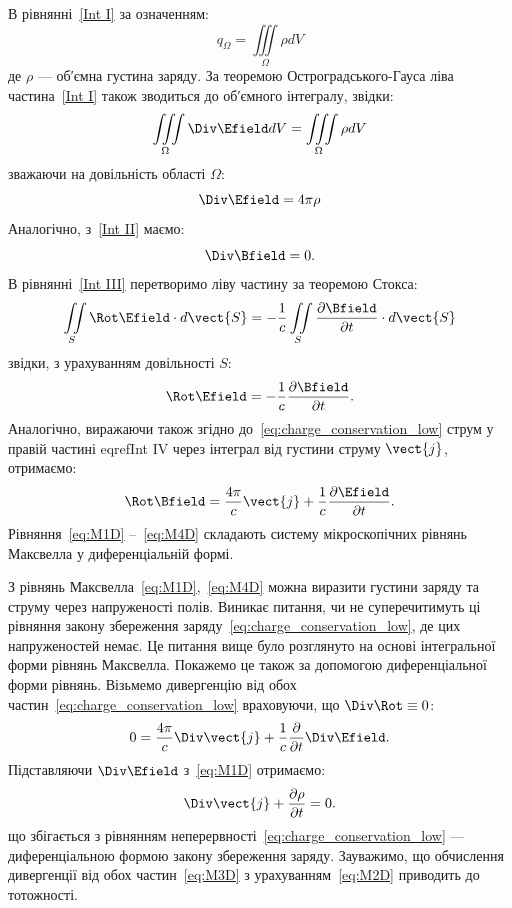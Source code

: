 В рівнянні~\eqref{Int I} за означенням:
\begin{equation}
	q_{\Omega} = \iiint\limits_{\Omega} \rho dV
\end{equation}
де $\rho$ ---  об′ємна густина заряду. За теоремою Остроградського-Гауса ліва частина~\eqref{Int I} також зводиться до об′ємного інтегралу, звідки:
\begin{equation*}
	\iiint\limits_{\Omega} \Div\Efield dV = \iiint\limits_{\Omega} \rho dV
\end{equation*}
зважаючи на довільність області $\Omega$:
\begin{equation}\label{eq:M1D}
	\Div\Efield = 4\pi\rho
\end{equation}
Аналогічно, з~\eqref{Int II} маємо:
\begin{equation}\label{eq:M2D}
	\Div\Bfield = 0.
\end{equation}
В рівнянні~\eqref{Int III} перетворимо ліву частину за теоремою Стокса:
\begin{equation*}
	\iint\limits_{S} \Rot\Efield\cdot d\vect{S} = - \frac1c \iint\limits_S \frac{\partial\Bfield}{\partial t}\cdot d\vect{S}
\end{equation*}
звідки, з урахуванням довільності $S$:
\begin{equation}\label{eq:M3D}
	\Rot\Efield = - \frac1c \frac{\partial\Bfield}{\partial t}.
\end{equation}
Аналогічно, виражаючи також згідно до~\eqref{eq:charge_conservation_low} струм у правій частині
eqref{Int IV}  через інтеграл від густини струму $\vect{j}$, отримаємо:
\begin{equation}\label{eq:M4D}
	\Rot\Bfield = \frac{4\pi}c\vect{j} + \frac1c \frac{\partial\Efield}{\partial t}.
\end{equation}
Рівняння~\eqref{eq:M1D} --~\eqref{eq:M4D} складають систему мікроскопічних рівнянь
Максвелла у диференціальній формі.

З рівнянь Максвелла~\eqref{eq:M1D},~\eqref{eq:M4D} можна виразити густини заряду та
струму через напруженості полів. Виникає питання, чи не суперечитимуть ці
рівняння закону збереження заряду~\eqref{eq:charge_conservation_low}, де цих напруженостей немає. Це
питання вище було розглянуто на основі інтегральної форми рівнянь
Максвелла. Покажемо це також за допомогою диференціальної форми рівнянь.
Візьмемо дивергенцію від обох частин~\eqref{eq:charge_conservation_low} враховуючи, що $\Div\Rot\equiv0$:
\begin{equation*}
	0 = \frac{4\pi}c\Div\vect{j} + \frac1c \frac{\partial}{\partial t} \Div\Efield.
\end{equation*}
Підставляючи $\Div\Efield$ з~\eqref{eq:M1D} отримаємо:
\begin{equation*}
	\Div\vect{j} + \frac{\partial\rho}{\partial t} = 0.
\end{equation*}
що збігається з рівнянням неперервності~\eqref{eq:charge_conservation_low} --- диференціальною формою
закону збереження заряду.
Зауважимо, що обчислення дивергенції від обох частин~\eqref{eq:M3D} з
урахуванням~\eqref{eq:M2D} приводить до тотожності.


